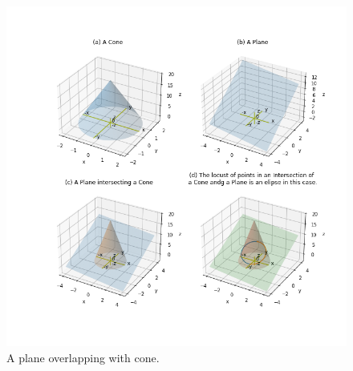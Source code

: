 \documentclass[10pt,a4paper,leqno]{article}
\begin{document}
\begin{CJK*}{UTF8}{gbsn}
\begin{figure}[H]
\centering\includegraphics[width=1\linewidth,height=0.35\textheight]{Data/fgr02.png}
\caption{A plane overlapping with cone.}
\label{fig:Data/fgr02.png}
\end{figure}


\end{CJK*}
\end{document}
